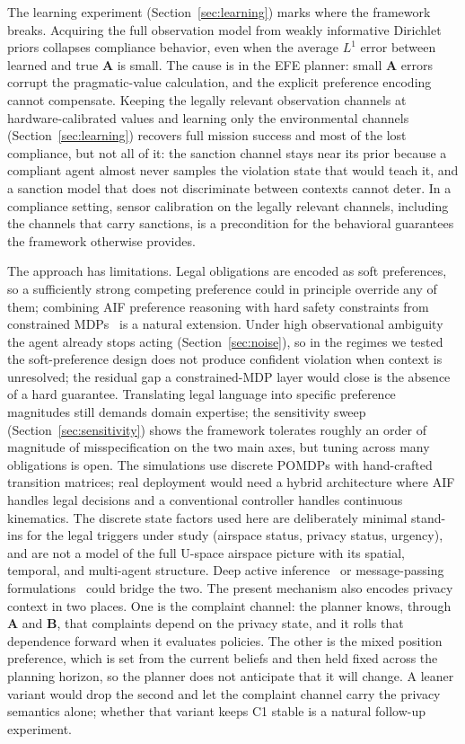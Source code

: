 \documentclass[10pt,twocolumn]{article}
\begin{document}
The learning experiment (Section~\ref{sec:learning}) marks where the framework breaks. Acquiring the full observation model from weakly informative Dirichlet priors collapses compliance behavior, even when the average $L^1$ error between learned and true $\mathbf{A}$ is small. The cause is in the EFE planner: small $\mathbf{A}$ errors corrupt the pragmatic-value calculation, and the explicit preference encoding cannot compensate. Keeping the legally relevant observation channels at hardware-calibrated values and learning only the environmental channels (Section~\ref{sec:learning}) recovers full mission success and most of the lost compliance, but not all of it: the sanction channel stays near its prior because a compliant agent almost never samples the violation state that would teach it, and a sanction model that does not discriminate between contexts cannot deter. In a compliance setting, sensor calibration on the legally relevant channels, including the channels that carry sanctions, is a precondition for the behavioral guarantees the framework otherwise provides.

The approach has limitations. Legal obligations are encoded as soft preferences, so a sufficiently strong competing preference could in principle override any of them; combining AIF preference reasoning with hard safety constraints from constrained MDPs~\cite{garcia2015} is a natural extension. Under high observational ambiguity the agent already stops acting (Section~\ref{sec:noise}), so in the regimes we tested the soft-preference design does not produce confident violation when context is unresolved; the residual gap a constrained-MDP layer would close is the absence of a hard guarantee. Translating legal language into specific preference magnitudes still demands domain expertise; the sensitivity sweep (Section~\ref{sec:sensitivity}) shows the framework tolerates roughly an order of magnitude of misspecification on the two main axes, but tuning across many obligations is open. The simulations use discrete POMDPs with hand-crafted transition matrices; real deployment would need a hybrid architecture where AIF handles legal decisions and a conventional controller handles continuous kinematics. The discrete state factors used here are deliberately minimal stand-ins for the legal triggers under study (airspace status, privacy status, urgency), and are not a model of the full U-space airspace picture with its spatial, temporal, and multi-agent structure. Deep active inference~\cite{fountas2020} or message-passing formulations~\cite{senoz2021} could bridge the two. The present mechanism also encodes privacy context in two places. One is the complaint channel: the planner knows, through $\mathbf{A}$ and $\mathbf{B}$, that complaints depend on the privacy state, and it rolls that dependence forward when it evaluates policies. The other is the mixed position preference, which is set from the current beliefs and then held fixed across the planning horizon, so the planner does not anticipate that it will change. A leaner variant would drop the second and let the complaint channel carry the privacy semantics alone; whether that variant keeps C1 stable is a natural follow-up experiment.
\end{document}
